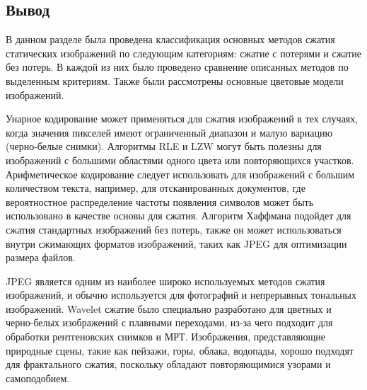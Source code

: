 \subsection*{Вывод}

В данном разделе была проведена классификация основных методов сжатия статических изображений по следующим категориям: сжатие с потерями и сжатие без потерь. В каждой из них было проведено сравнение описанных методов по выделенным критериям. Также были рассмотрены основные цветовые модели изображений.

Унарное кодирование может применяться для сжатия изображений в тех случаях, когда значения пикселей имеют ограниченный диапазон и малую вариацию (черно-белые снимки). Алгоритмы RLE и LZW могут быть полезны для изображений с большими областями одного цвета или повторяющихся участков. Арифметическое кодирование следует использовать для изображений с большим количеством текста, например, для отсканированных документов, где вероятностное распределение частоты появления символов может быть использовано в качестве основы для сжатия. Алгоритм Хаффмана подойдет для сжатия стандартных изображений без потерь, также он может использоваться внутри сжимающих форматов изображений, таких как JPEG для оптимизации размера файлов.

JPEG является одним из наиболее широко используемых методов сжатия изображений, и обычно используется для фотографий и непрерывных тональных изображений. Wavelet сжатие было специально разработано для цветных и черно-белых изображений с плавными переходами, из-за чего подходит для обработки рентгеновских снимков и МРТ. Изображения, представляющие природные сцены, такие как пейзажи, горы, облака, водопады, хорошо подходят для фрактального сжатия, поскольку обладают повторяющимися узорами и самоподобием.
